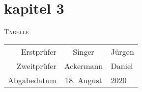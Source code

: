 \section{kapitel 3}

\begin{center}

    \Huge{\textsc{Tabelle}}
    \normalsize

    \vspace{20mm}

    \begin{tabular}{r c l}
        Erstprüfer & Singer & Jürgen \\
        Zweitprüfer & Ackermann & Daniel \\
        Abgabedatum & 18. August & 2020 \\
    \end{tabular}
\end{center}